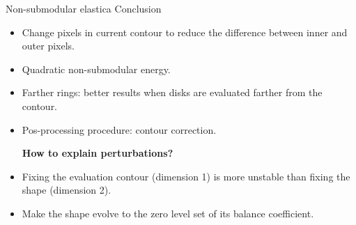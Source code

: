 \begin{frame}
{Non-submodular elastica}
{Conclusion}

\begin{itemize}
\item{Change pixels in current contour to reduce the difference between inner and outer pixels.}\pause
\item{Quadratic non-submodular energy.}\pause
\item{Farther rings: better results when disks are evaluated farther from the contour. }\pause
\item{Pos-processing procedure: contour correction. }
\pause\vspace{1em}

\textbf{How to explain perturbations?}

\item{Fixing the evaluation contour (dimension 1) is more unstable than fixing the shape (dimension 2).}
\item{Make the shape evolve to the zero level set of its balance coefficient.}
\end{itemize}
\end{frame}


